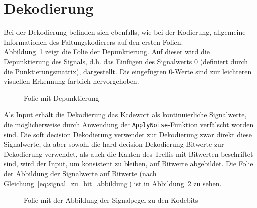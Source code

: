 \section{Dekodierung}
\label{kapitel:visualisierung_dekodierung}
Bei der Dekodierung befinden sich ebenfalls, wie bei der Kodierung, allgemeine Informationen des Faltungskodierers auf den ersten Folien.
\\
Abbildung~\ref{abb:folie_depunktierung} zeigt die Folie der Depunktierung. Auf dieser wird die Depunktierung des Signals, d.h. das Einfügen des Signalwerts 0 (definiert durch die Punktierungsmatrix), dargestellt. Die eingefügten 0-Werte sind zur leichteren visuellen Erkennung farblich hervorgehoben.
\begin{figure}[th]
	\centering
	\caption{Folie mit Depunktierung}
	\label{abb:folie_depunktierung}
\end{figure}
Als Input erhält die Dekodierung das Kodewort als kontinuierliche Signalwerte, die möglicherweise durch Anwendung der \texttt{ApplyNoise}-Funktion verfälscht worden sind. Die soft decision Dekodierung verwendet zur Dekodierung zwar direkt diese Signalwerte, da aber sowohl die hard decision Dekodierung Bitwerte zur Dekodierung verwendet, als auch die Kanten des Trellis mit Bitwerten beschriftet sind, wird der Input, um konsistent zu bleiben, auf Bitwerte abgebildet. Die Folie der Abbildung der Signalwerte auf Bitwerte (nach Gleichung~\ref{eq:signal_zu_bit_abbildung}) ist in Abbildung~\ref{abb:folie_signal_zu_bit_abbildung} zu sehen.
\begin{figure}[th]
	\centering
	\caption{Folie mit der Abbildung der Signalpegel zu den Kodebits}
	\label{abb:folie_signal_zu_bit_abbildung}
\end{figure}
